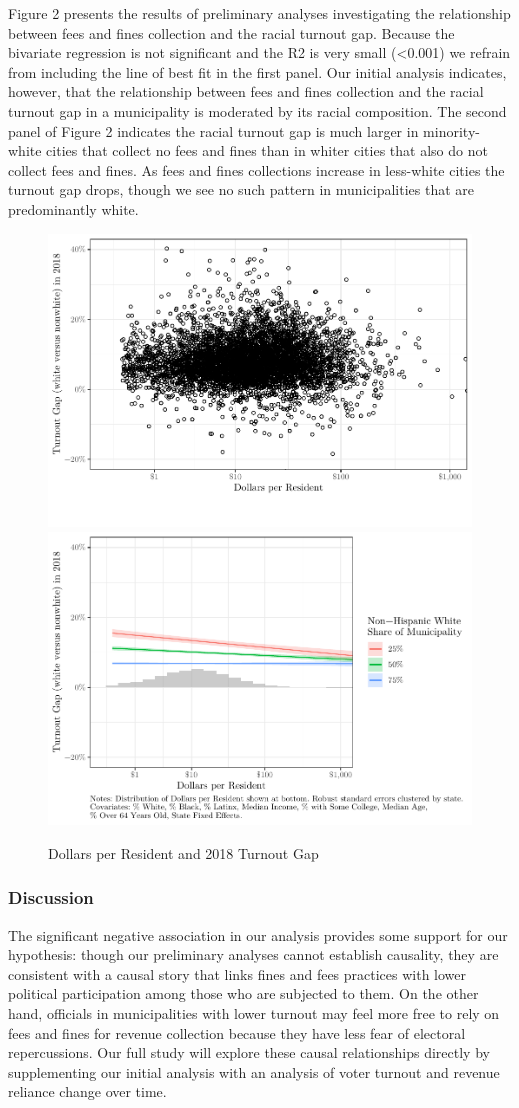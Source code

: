 \documentclass[
  12pt,
]{article}
\begin{document}
Figure 2 presents the results of preliminary analyses investigating the relationship between fees and fines collection and the racial turnout gap. Because the bivariate regression is not significant and the R2 is very small (\textless0.001) we refrain from including the line of best fit in the first panel. Our initial analysis indicates, however, that the relationship between fees and fines collection and the racial turnout gap in a municipality is moderated by its racial composition. The second panel of Figure 2 indicates the racial turnout gap is much larger in minority-white cities that collect no fees and fines than in whiter cities that also do not collect fees and fines. As fees and fines collections increase in less-white cities the turnout gap drops, though we see no such pattern in municipalities that are predominantly white.

\begin{figure}[H]
\includegraphics[width=0.5\linewidth]{fees_fines_to_files/figure-latex/unnamed-chunk-1-1} \includegraphics[width=0.5\linewidth]{fees_fines_to_files/figure-latex/unnamed-chunk-1-2} \caption{\label{fig:marg1}Dollars per Resident and 2018 Turnout Gap}\label{fig:unnamed-chunk-1}
\end{figure}

\hypertarget{discussion}{%
\subsubsection*{Discussion}\label{discussion}}

The significant negative association in our analysis provides some support for our hypothesis: though our preliminary analyses cannot establish causality, they are consistent with a causal story that links fines and fees practices with lower political participation among those who are subjected to them. On the other hand, officials in municipalities with lower turnout may feel more free to rely on fees and fines for revenue collection because they have less fear of electoral repercussions. Our full study will explore these causal relationships directly by supplementing our initial analysis with an analysis of voter turnout and revenue reliance change over time.
\end{document}

